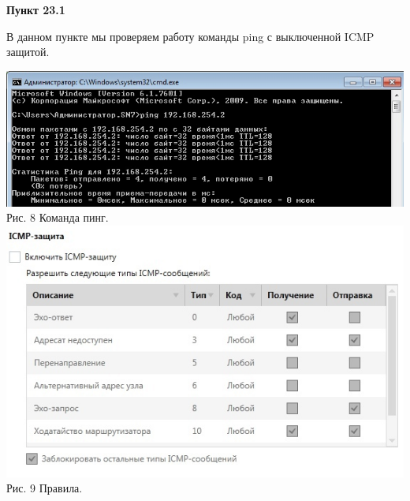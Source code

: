 \documentclass[a4paper,14pt]{extarticle}
\begin{document}
    \textbf{Пункт 23.1}
    \vspace{-3ex}
    \begin{center}
        \singlespacing
        В данном пункте мы проверяем работу команды ping с выключенной ICMP защитой.

        \begin{multicols}{2}
            \includegraphics[scale=0.4]{pics/23.1_1.jpg}
            Рис. 8 Команда пинг.
            \includegraphics[scale=0.4]{pics/23.1_2.jpg}
            Рис. 9 Правила.
        \end{multicols}

    \end{center}
\end{document}
